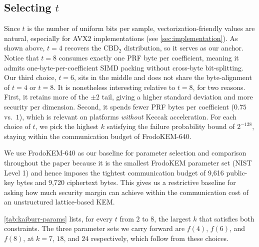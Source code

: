 \subsection{Selecting $t$}
Since $t$ is the number of uniform bits per sample, vectorization-friendly
values are natural, especially for AVX2 implementations (see \cref{sec:implementation}). As shown above, $t=4$ recovers the $\mathrm{CBD}_2$ distribution, so it serves
as our anchor. Notice that $t=8$ consumes exactly one PRF byte per coefficient, meaning it
admits one-byte-per-coefficient SIMD packing without cross-byte bit-splitting.
Our third choice, $t=6$, sits in the middle and does not share the byte-alignment of $t=4$ or $t=8$. It is nonetheless interesting relative to $t=8$, for two reasons.
First, it retains more of the $\pm2$ tail, giving a higher standard deviation and more security per dimension.
Second, it spends fewer PRF bytes per coefficient ($0.75$ vs.\ $1$), which is relevant on platforms \emph{without} Keccak acceleration.
For each choice of $t$, we pick the highest $k$ satisfying the failure probability bound of $2^{-128}$, staying within the communication budget of
FrodoKEM-640. 

We use FrodoKEM-640 as our baseline for parameter selection and comparison throughout the paper because it is the 
smallest FrodoKEM parameter set (NIST Level 1) and hence imposes the tightest communication budget of 9,616 public-key 
bytes and 9,720 ciphertext bytes. This gives us 
a restrictive baseline for asking how much security margin \kaiburr can achieve within the communication cost 
of an unstructured lattice-based KEM.

\cref{tab:kaiburr-params} lists, for every $t$ from $2$ to $8$, the largest $k$ that
satisfies both constraints. The three parameter sets we carry forward are $f(4)$, $f(6)$, and
$f(8)$, at $k=7$, $18$, and $24$ respectively, which follow from these choices.

